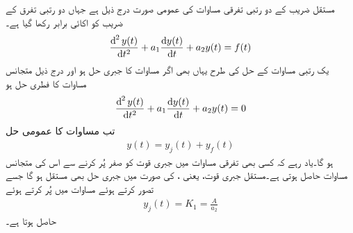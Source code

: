 مستقل  ضریب  کے دو رتبی تفرقی مساوات کی عمومی صورت درج ذیل ہے جہاں دو رتبی تفرق کے  ضریب  کو اکائی برابر رکھا گیا ہے۔
\begin{align}\label{مساوات_عارضی_دو_درجی_عمومی_الف}
\frac{\dif^{\,2} y(t)}{\dif t^2}+a_1\frac{\dif y(t)}{\dif t}+a_2 y(t)=f(t)
\end{align}
یک رتبی مساوات کے حل کی طرح یہاں بھی اگر مساوات  کا جبری حل  ہو اور درج ذیل متجانس مساوات کا فطری حل  ہو
 \begin{align}\label{مساوات_عارضی_دو_درجی_عمومی_ہم_جنسی_الف}
\frac{\dif^{\,2} y(t)}{\dif t^2}+a_1\frac{\dif y(t)}{\dif t}+a_2 y(t)=0
\end{align}
تب مساوات  کا عمومی حل
\begin{align}
y(t)=y_j(t)+y_f(t)
\end{align}
ہو گا۔یاد رہے کہ کسی بھی تفرقی مساوات میں جبری قوت کو صفر  پُر کرنے سے اس کی متجانس مساوات حاصل ہوتی ہے۔مستقل جبری قوت، یعنی ، کی صورت میں جبری حل بھی مستقل ہو گا جسے  تصور کرتے ہوئے مساوات  میں پُر کرتے ہوئے
\begin{align}
y_j(t)=K_1=\frac{A}{a_2}
\end{align}
حاصل ہوتا ہے۔

